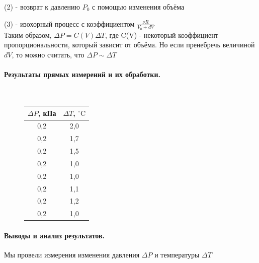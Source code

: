 \documentclass{article}
\begin{document}
(2) - возврат к давлению $P_0$ с помощью изменения объёма

(3) - изохорный процесс с коэффициентом $ \frac{\nu R}{V_0+dV} $\\

Таким образом, $\Delta P=C(V)\Delta T$, где C(V) - некоторый коэффициент пропорциональности, который зависит от объёма. Но если пренебречь величиной $dV$, то можно считать, что $\Delta P \sim \Delta T$

\paragraph{Результаты прямых измерений и их обработки.}

\begin{figure}[h]
	\\
	\begin{tabular}{c|c}
	$\Delta P$, кПа&$\Delta T$, $^\circ\mbox{C}$\\
	\hline
	0,2&2,0 \\
	0,2&1,7  \\
	0,2&1,5  \\
	0,2&1,0  \\
	0,2&1,0 \\
	0,2&1,1 \\
	0,2& 1,2 \\
	0,2& 1,0 \\
\end{tabular}
\end{figure}




\paragraph{Выводы и анализ результатов.}
Мы провели измерения изменения давления $\Delta P$ и температуры $\Delta T$
\end{document}
